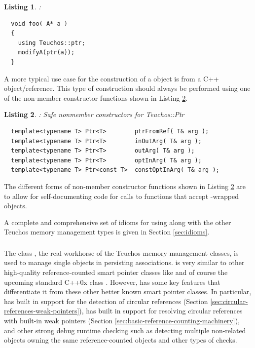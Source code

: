 \documentclass[pdf,ps2pdf,11pt]{SANDreport}
\newtheorem{listing}{Listing}
\begin{document}
\begin{listing}:\\
\label{listing:using-ptr}
{\small\begin{verbatim}
  void foo( A* a )
  {
    using Teuchos::ptr;
    modifyA(ptr(a));
  }
\end{verbatim}}
\end{listing}

A more typical use case for the construction of a {}
object is from a C++ object/reference.  This type of construction
should always be performed using one of the non-member constructor
functions shown in Listing
{}\ref{listing:ptr-from-ref-nonmember-constructors}.

\begin{listing}: Safe nonmember constructors for Teuchos::Ptr\\
\label{listing:ptr-from-ref-nonmember-constructors}
{\small\begin{verbatim}
  template<typename T> Ptr<T>        ptrFromRef( T& arg );
  template<typename T> Ptr<T>        inOutArg( T& arg );
  template<typename T> Ptr<T>        outArg( T& arg );
  template<typename T> Ptr<T>        optInArg( T& arg );
  template<typename T> Ptr<const T>  constOptInArg( T& arg );
\end{verbatim}}
\end{listing}

The different forms of non-member constructor functions shown in
Listing {}\ref{listing:ptr-from-ref-nonmember-constructors} are to
allow for self-documenting code for calls to functions that accept
{}-wrapped objects.

A complete and comprehensive set of idioms for using {}
along with the other Teuchos memory management types is given in
Section {}\ref{sec:idioms}.


%
{}\subsubsection{}
\label{sec:RCP}
%

The class {}, the real workhorse of the Teuchos memory
management classes, is used to manage single objects in persisting
associations.  {} is very similar to other high-quality
reference-counted smart pointer classes like
{} and of course the upcoming standard
C++0x class {}.  However, {} has
some key features that differentiate it from these other better known
smart pointer classes.  In particular, {} has built in
support for the detection of circular references (Section
{}\ref{sec:circular-references-weak-pointers}), has built in support
for resolving circular references with built-in weak pointers (Section
{}\ref{sec:basic-reference-counting-machinery}), and other strong
debug runtime checking such as detecting multiple non-related
{} objects owning the same reference-counted objects and
other types of checks.
\end{document}
